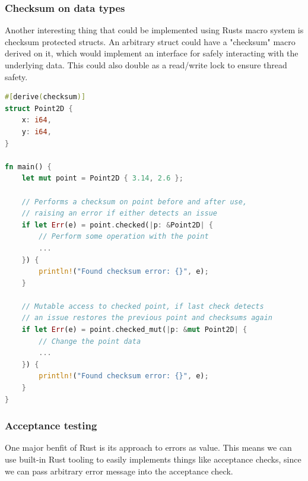 \documentclass[12pt, letterpaper]{article}
\begin{document}
\subsubsection{Checksum on data types}

Another interesting thing that could be implemented using Rusts macro system is checksum protected structs. An arbitrary struct could have a "checksum" macro derived on it, which would implement an interface for safely interacting with the underlying data. This could also double as a read/write lock to ensure thread safety.

\begin{lstlisting}[language=Rust]
#[derive(checksum)]
struct Point2D {
    x: i64,
    y: i64,
}

fn main() {
    let mut point = Point2D { 3.14, 2.6 };

    // Performs a checksum on point before and after use, 
    // raising an error if either detects an issue 
    if let Err(e) = point.checked(|p: &Point2D| {
        // Perform some operation with the point
        ...
    }) {
        println!("Found checksum error: {}", e);
    }

    // Mutable access to checked point, if last check detects 
    // an issue restores the previous point and checksums again
    if let Err(e) = point.checked_mut(|p: &mut Point2D| {
        // Change the point data
        ...
    }) {
        println!("Found checksum error: {}", e);
    }
}
\end{lstlisting}

\subsubsection{Acceptance testing}

One major benfit of Rust is its approach to errors as value. This means we can use built-in Rust tooling to easily implements things like acceptance checks, since we can pass arbitrary error message into the acceptance check.
\end{document}
